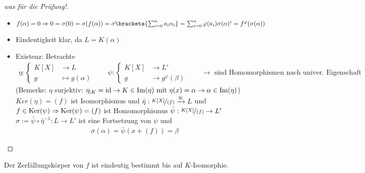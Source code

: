 \begin{proof}[was für die Prüfung!]
	\begin{itemize}
		\item $f(\alpha) = 0 \Rightarrow 0 = \sigma(0) = \sigma(f(\alpha)) = \sigma\brackets{\sum_{i=0}^n a_i \alpha_i} = \sum_{i=0}^n \varphi(a_i)\sigma(\alpha)^i = f^{\varphi}(\sigma(\alpha))$
		\item Eindeutigkeit klar, da $L=K(\alpha)$
		\item Existenz: Betrachte 
		\begin{align*}
			\eta: 
			\begin{cases}
				K[X] &\to L\\
				g &\mapsto g(\alpha)
			\end{cases}\qquad
			\psi:
			\begin{cases}
				K[X] &\to L'\\
				g &\to g^{\varphi}(\beta) 
			\end{cases}\qquad \to \text{ sind Homomorphismen nach univer. Eigenschaft}
		\end{align*}
		(Bemerke: $\eta$ surjektiv: $\eta_{\mid K} = \operatorname{id} \to K \in \operatorname{Im}(\eta) \text{ mit } \eta(x) = \alpha \to \alpha \in \operatorname{Im}(\eta)$)\\
		$Ker(\eta)=(f)$ ist Isomorphismus und $\bar{\eta}: \lnkset{K[X]}{(f)} \xrightarrow{\cong}L$ und\\
		$f \in \operatorname{Ker}(\psi) \Rightarrow \operatorname{Ker}(\psi) = (f)$ ist Homomorphismus $\bar{\psi}: \lnkset{K[X]}{(f)} \to L'$\\
		$\sigma:= \bar{\psi}\circ \bar{\eta}^{-1}: L \to L'$ ist eine Fortsetzung von $\psi$ und
		\begin{align*}
			\sigma(\alpha) = \bar{\psi}(x+(f)) = \beta
		\end{align*}
	\end{itemize}
\end{proof}
\begin{proposition}
	Der Zerfällungskörper von $f$ ist eindeutig bestimmt bis auf $K$-Isomorphie.
\end{proposition}
